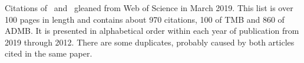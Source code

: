 \documentclass[12pt,letterpaper]{article}
\begin{document}
Citations of~\cite{ADMB0000} and~\cite{TMB0000} gleaned from Web of
Science in March 2019. 
This list is over 100 pages in length and
contains about 970 citations, 100 of
TMB and 860 of ADMB. 
It is presented in alphabetical order within each year of publication
from 2019 through 2012. 
There are some duplicates, probably caused by both articles cited in
the same paper. 

\nocite{*}

\printbibliography[keyword=primary,title=Essential Publications]
\clearpage\printbibliography[keyword=2019,title=Publication Year 2019]
\clearpage\printbibliography[keyword=2018,title=Publication Year 2018]
\clearpage\printbibliography[keyword=2017,title=Publication Year 2017]
\clearpage\printbibliography[keyword=2016,title=Publication Year 2016]
\clearpage\printbibliography[keyword=2015,title=Publication Year 2015]
\clearpage\printbibliography[keyword=2014,title=Publication Year 2014]
\clearpage\printbibliography[keyword=2013,title=Publication Year 2013]
\clearpage\printbibliography[keyword=2012,title=Publication Year 2012]

\end{document}

